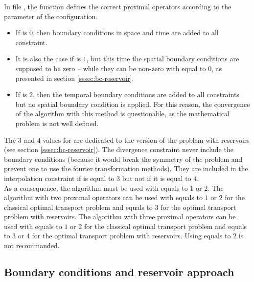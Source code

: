         In file
        , the function  defines the correct proximal
        operators according to the parameter  of the
        configuration.
        \begin{itemize}
            \item If  is $0$, then boundary conditions in space and time are added to all constraint.
            \item It is also the case if  is $1$, but this time the spatial boundary conditions are supposed to be zero
                -- while they can be non-zero with  equal to $0$, as presented in section \ref{sssec:bc-reservoir}.
            \item If  is $2$, then the temporal boundary conditions are added to all constraints but no spatial boundary condition
                is applied. For this reason, the convergence of the algorithm with this method is questionable, as the 
                mathematical problem is not well defined.
        \end{itemize}

        The $3$ and $4$ values for  are dedicated to the version of the problem with reservoirs (see section
        \ref{sssec:bc-reservoir}). The divergence constraint never include the boundary conditions (because it would break
        the symmetry of the problem and prevent one to use the fourier transformation methods). They are included in the 
        interpolation constraint if  is equal to $3$ but not if it is equal to $4$.\\

        As a consequence, the \pdAlgo{} algorithm must be used with  equals to $1$ or $2$. The
        \drAlgo{} algorithm with two proximal operators 
        can be used with  equals to $1$ or $2$ for the classical optimal transport problem
        and  equals to $3$ for the optimal transport problem with reservoirs.
        The \drAlgo{} algorithm with three proximal operators can be used with  equals 
        to $1$ or $2$ for the classical optimal transport problem and  equals to $3$ or $4$ for 
        the optimal transport problem with reservoirs. Using   equals to $2$ is not recommanded.

    \subsection{Boundary conditions and reservoir approach\label{sssec:bc-reservoir}}
    \noindent
        
